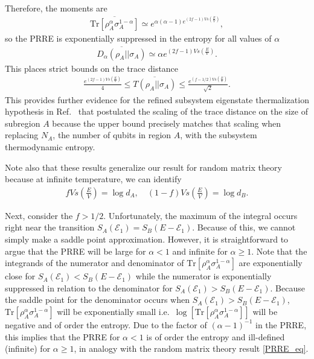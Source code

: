 \documentclass[a4paper,11pt]{article}
\newcommand{\Tr}{\text{Tr}}
\begin{document}
Therefore, the moments are
\begin{align}
    \overline{\Tr \left[\rho_A^{\alpha}\sigma_A^{1-\alpha}\right]}\simeq  e^{\alpha(\alpha -1)e^{(2 f-1) V s\left(\frac{E}{V}\right)}},
\end{align}
so the PRRE is exponentially suppressed in the entropy for all values of $\alpha$
\begin{align}
    \overline{D_{\alpha}(\rho_A || \sigma_A)} \simeq \alpha e^{(2 f-1) V s\left(\frac{E}{V}\right)}.
\end{align}
This places strict bounds on the trace distance
\begin{align}
    \frac{e^{(2 f-1) V s\left(\frac{E}{V}\right)}}{4}\leq \overline{T(\rho_A || \sigma_A)}\leq\frac{e^{( f-1/2) V s\left(\frac{E}{V}\right)}}{\sqrt{2}}.
\end{align}
This provides further evidence for the refined subsystem eigenstate thermalization hypothesis in Ref.~\cite{2018PhRvE..97a2140D} that postulated the scaling of the trace distance on the size of subregion $A$ because the upper bound precisely matches that scaling when replacing $N_A$, the number of qubits in region $A$, with the subsystem thermodynamic entropy.

Note also that these results generalize our result for random matrix theory because at infinite temperature, we can identify
\begin{align}
    f V s\left(\frac{E}{V} \right) = \log d_A ,\quad  (1-f) V s\left(\frac{E}{V} \right) = \log d_B.
\end{align}

Next, consider the $f > 1/2$. Unfortunately, the maximum of the integral occurs right near the transition $S_A(\mathcal{E}_1)=S_B(E-\mathcal{E}_1)$.
Because of this, we cannot simply make a saddle point approximation. However, it is straightforward to argue that the PRRE will be large for $\alpha < 1$ and infinite for $\alpha \geq 1$. Note that the integrands of the numerator and denominator of ${\Tr \left[\rho_A^{\alpha}\sigma_A^{1-\alpha}\right]}$ are exponentially close for $S_A(\mathcal{E}_1)<S_B(E-\mathcal{E}_1)$ while the numerator is exponentially suppressed in relation to the denominator for $S_A(\mathcal{E}_1)>S_B(E-\mathcal{E}_1)$. Because the saddle point for the denominator occurs when $S_A(\mathcal{E}_1)>S_B(E-\mathcal{E}_1)$, ${\Tr \left[\rho_A^{\alpha}\sigma_A^{1-\alpha}\right]}$ will be exponentially small i.e.~$\log\left[{\Tr \left[\rho_A^{\alpha}\sigma_A^{1-\alpha}\right]}\right]$ will be negative and of order the entropy. Due to the factor of $(\alpha-1)^{-1}$ in the PRRE, this implies that the PRRE for $\alpha < 1$ is of order the entropy and ill-defined (infinite) for $\alpha \geq 1$, in analogy with the random matrix theory result \eqref{PRRE_eq}.
\end{document}
